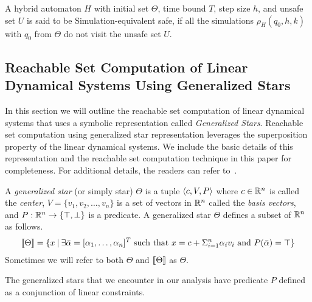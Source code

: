 \begin{definition}
\label{def:simSafe}
A hybrid automaton $H$ with initial set $\Theta$, time bound $T$, step size $h$, and unsafe set $U$ is said to be Simulation-equivalent safe, if all the simulations $\rho_{H}(q_0, h, k)$ with $q_0$ from $\Theta$ do not visit the unsafe set $U$.
\end{definition}

\subsection{Reachable Set Computation of Linear Dynamical Systems Using Generalized Stars}
\label{sec:reachStars}

In this section we will outline the reachable set computation of linear dynamical systems that uses a symbolic representation called \emph{Generalized Stars}.
%
Reachable set computation using generalized star representation leverages the superposition property of the linear dynamical systems.
%
We include the basic details of this representation and the reachable set computation technique in this paper for completeness. For additional details, the readers can refer to~\cite{duggirala2016parsimonious,bak2017tacas}.

\begin{definition}
\label{def:genStar}
A \emph{generalized star} (or simply star) $\Theta$ is a tuple $\tup{c,V,P}$ where $c \in \reals^n$ is called the \emph{center}, $V = \{v_1,v_2,\ldots, v_n\}$ is a set of vectors in $\reals^n$ called the \emph{basis vectors}, and $P: \reals^n \rightarrow \{\top, \bot\}$ is a predicate. A generalized star $\Theta$ defines a subset of $\reals^n$ as follows.
\begin{eqnarray*}
[\![ \Theta ]\!] = \{ x\: |\: \exists \bar{\alpha} = [\alpha_1, \ldots, \alpha_n]^T \mbox{ such that } x = c + \Sigma_{i=1}^n \alpha_i v_i \mbox{ and } P(\bar{\alpha}) = \top \}
\end{eqnarray*}
Sometimes we will refer to both $\Theta$ and $[\![ \Theta ]\!]$ as $\Theta$.
\end{definition}
The generalized stars that we encounter in our analysis have predicate $P$ defined as a conjunction of linear constraints.


